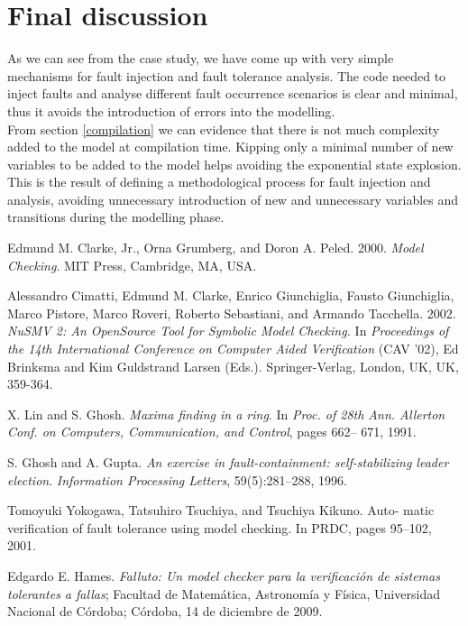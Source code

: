 \documentclass[12pt]{llncs2e/llncs}
\begin{document}
\section{Final discussion}
As we can see from the case study, we have come up with very simple mechanisms for fault injection and fault tolerance analysis. The code needed to inject faults and analyse different fault occurrence scenarios is clear and minimal, thus it avoids the introduction of errors into the modelling.\\
From section \ref{compilation} we can evidence that there is not much complexity added to the model at compilation time. Kipping only a minimal number of new variables to be added to the model helps avoiding the exponential state explosion. This is the result of defining a methodological process for fault injection and analysis, avoiding unnecessary introduction of new and unnecessary variables and transitions during the modelling phase.\\



%
%
\begin{thebibliography}{9}

    Edmund M. Clarke, Jr., Orna Grumberg, and Doron A. Peled. 2000.
    \emph{Model Checking}. MIT Press, Cambridge, MA, USA. 

    Alessandro Cimatti, Edmund M. Clarke, Enrico Giunchiglia, Fausto
    Giunchiglia, Marco Pistore, Marco Roveri, Roberto Sebastiani, and Armando
    Tacchella. 2002. \emph{NuSMV 2: An OpenSource Tool for Symbolic Model
    Checking.} In \emph{Proceedings of the 14th International Conference on
    Computer Aided Verification} (CAV '02), Ed Brinksma and Kim Guldstrand
    Larsen (Eds.). Springer-Verlag, London, UK, UK, 359-364. 

    X. Lin and S. Ghosh. \emph{Maxima finding in a ring}. In \emph{Proc. of 28th Ann.
    Allerton Conf. on Computers, Communication, and Control}, pages 662–
    671, 1991.

    S. Ghosh and A. Gupta. \emph{An exercise in fault-containment: self-stabilizing
    leader election}. \emph{Information Processing Letters}, 59(5):281–288, 1996.

    Tomoyuki Yokogawa, Tatsuhiro Tsuchiya, and Tsuchiya Kikuno. Auto-
    matic verification of fault tolerance using model checking. In PRDC,
    pages 95–102, 2001.
    
    Edgardo E. Hames. \emph{Falluto: Un model checker para la verificaci\'on de sistemas tolerantes a fallas}; Facultad de Matem\'atica, Astronom\'ia y F\'isica, Universidad Nacional de C\'ordoba; C\'ordoba, 14 de diciembre de 2009.

\end{thebibliography}
\end{document}
